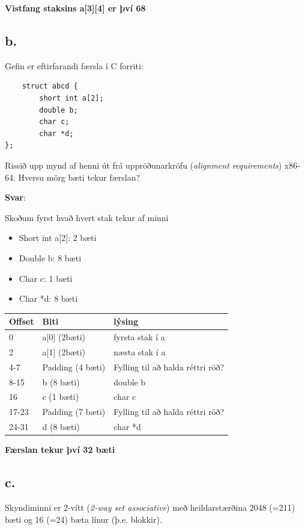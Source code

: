 \documentclass{article}
\begin{document}
\textbf{Vistfang staksins a[3][4] er því 68}


\subsection{b.} Gefin er eftirfarandi færsla í C forriti:

\begin{verbatim}
    struct abcd {
        short int a[2];
        double b;
        char c;
        char *d;
};
\end{verbatim}

Rissið upp mynd af henni út frá uppröðunarkröfu (\textit{alignment requirements}) x86-
64. Hversu mörg bæti tekur færslan?

\textbf{Svar}:

Skoðum fyrst hvað hvert stak tekur af minni


\begin{itemize}
    \item Short int a[2]: 2 bæti
    \item Double b: 8 bæti
    \item Char c: 1 bæti
    \item Char *d: 8 bæti
\end{itemize}

\begin{center}
    \begin{tabularx}{\textwidth}{|l|l|X|}
        \hline
        \textbf{Offset} & \textbf{Biti} & \textbf{lýsing} \\ \hline
        0 & a[0] (2bæti) & fyrsta stak í a \\ \hline
        2 & a[1] (2bæti) & næsta stak í a \\ \hline
        4-7 & Padding (4 bæti) & Fylling til að halda réttri röð? \\ \hline
        8-15 & b (8 bæti) & double b \\ \hline
        16 & c (1 bæti) & char c \\ \hline
        17-23 & Padding (7 bæti) & Fylling til að halda réttri röð? \\ \hline
        24-31 & d (8 bæti) & char *d \\ \hline
    \end{tabularx}
\end{center}

\textbf{Færslan tekur því 32 bæti}

\subsection{c.} Skyndiminni er 2-vítt (\textit{2-way set associative}) með heildarstærðina 2048 (=211)
bæti og 16 (=24) bæta línur (þ.e. blokkir).
\end{document}
